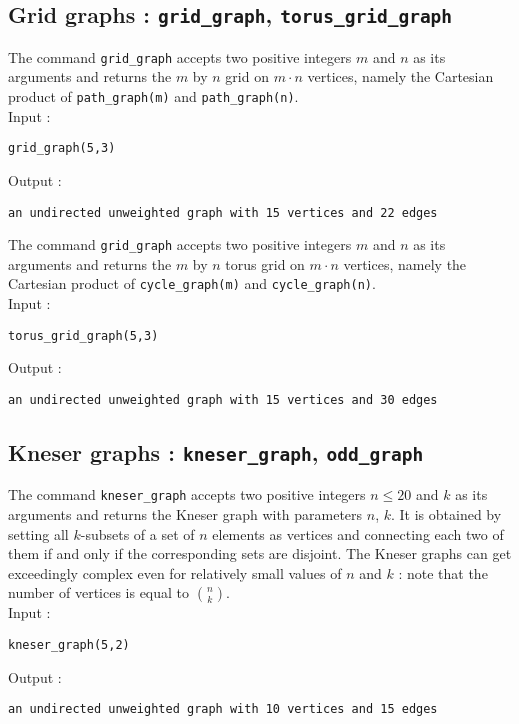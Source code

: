 \documentclass[a4paper,11pt]{article}
\begin{document}
\subsection{Grid graphs : {\tt grid\_graph}, {\tt torus\_grid\_graph}}

The command {\tt grid\_graph} accepts two positive integers $ m $ and $ n $ as its arguments and returns the $ m $ by $ n $ grid on $ m\cdot n $ vertices, namely the Cartesian product of {\tt path\_graph(m)} and {\tt path\_graph(n)}.\\
Input :
\begin{center}
  \tt grid\_graph(5,3)
\end{center}
Output :
\begin{center}
  \tt an undirected unweighted graph with 15 vertices and 22 edges
\end{center}

The command {\tt grid\_graph} accepts two positive integers $ m $ and $ n $ as its arguments and returns the $ m $ by $ n $ torus grid on $ m\cdot n $ vertices, namely the Cartesian product of {\tt cycle\_graph(m)} and {\tt cycle\_graph(n)}.\\
Input :
\begin{center}
  \tt torus\_grid\_graph(5,3)
\end{center}
Output :
\begin{center}
  \tt an undirected unweighted graph with 15 vertices and 30 edges
\end{center}

\subsection{Kneser graphs : {\tt kneser\_graph}, {\tt odd\_graph}}

The command {\tt kneser\_graph} accepts two positive integers $ n\leq 20 $ and $ k $ as its arguments and returns the Kneser graph with parameters $ n $, $ k $. It is obtained by setting all $ k $-subsets of a set of $ n $ elements as vertices and connecting each two of them if and only if the corresponding sets are disjoint. The Kneser graphs can get exceedingly complex even for relatively small values of $ n $ and $ k $ : note that the number of vertices is equal to $ \binom{n}{k} $.\\
Input :
\begin{center}
  \tt kneser\_graph(5,2)
\end{center}
Output :
\begin{center}
  \tt an undirected unweighted graph with 10 vertices and 15 edges
\end{center}
\end{document}
